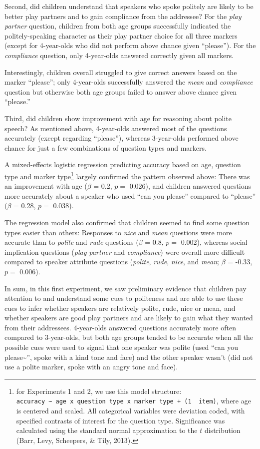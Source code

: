 \documentclass[10pt, letterpaper]{article}
\begin{document}
Second, did children understand that speakers who spoke politely are
likely to be better play partners and to gain compliance from the
addressee? For the \emph{play partner} question, children from both age
groups successfully indicated the politely-speaking character as their
play partner choice for all three markers (except for 4-year-olds who
did not perform above chance given ``please''). For the
\emph{compliance} question, only 4-year-olds answered correctly given
all markers.

Interestingly, children overall struggled to give correct answers based
on the marker ``please''; only 4-year-olds successfully answered the
\emph{mean} and \emph{compliance} question but otherwise both age groups
failed to answer above chance given ``please.''

Third, did children show improvement with age for reasoning about polite
speech? As mentioned above, 4-year-olds answered most of the questions
accurately (except regarding ``please''), whereas 3-year-olds performed
above chance for just a few combinations of question types and markers.

A mixed-effects logistic regression predicting accuracy based on age,
question type and marker type\footnote{for Experiments 1 and 2, we use
  this model structure:
  \texttt{accuracy\ \textasciitilde{}\ age\ x\ question\ type\ x\ marker\ type\ +\ (1\ \textbar{}\ item)},
  where age is centered and scaled. All categorical variables were
  deviation coded, with specified contrasts of interest for the question
  type. Significance was calculated using the standard normal
  approximation to the \(t\) distribution (Barr, Levy, Scheepers, \&
  Tily, 2013).} largely confirmed the pattern observed above: There was
an improvement with age (\(\beta\) = 0.2, \(p =\) 0.026), and children
answered questions more accurately about a speaker who used ``can you
please'' compared to ``please'' (\(\beta\) = 0.28, \(p =\) 0.038).

The regression model also confirmed that children seemed to find some
question types easier than others: Responses to \emph{nice} and
\emph{mean} questions were more accurate than to \emph{polite} and
\emph{rude} questions (\(\beta\) = 0.8, \(p =\) 0.002), whereas social
implication questions (\emph{play partner} and \emph{compliance}) were
overall more difficult compared to speaker attribute questions
(\emph{polite}, \emph{rude}, \emph{nice}, and \emph{mean}; \(\beta\) =
-0.33, \(p =\) 0.006).

In sum, in this first experiment, we saw preliminary evidence that
children pay attention to and understand some cues to politeness and are
able to use these cues to infer whether speakers are relatively polite,
rude, nice or mean, and whether speakers are good play partners and are
likely to gain what they wanted from their addressees. 4-year-olds
answered questions accurately more often compared to 3-year-olds, but
both age groups tended to be accurate when all the possible cues were
used to signal that one speaker was polite (used ``can you
please\textasciitilde{}'', spoke with a kind tone and face) and the
other speaker wasn't (did not use a polite marker, spoke with an angry
tone and face).
\end{document}
